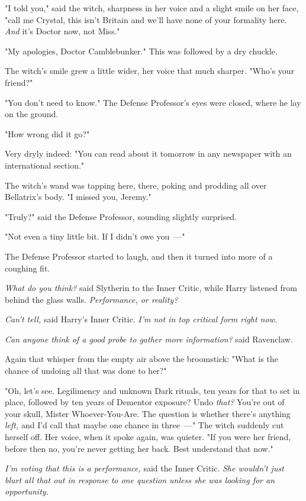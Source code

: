 "I told you," said the witch, sharpness in her voice and a slight smile on her
face, "call me Crystal, this isn't Britain and we'll have none of your
formality here. \emph{And} it's Doctor now, not Miss."

"My apologies, Doctor Camblebunker." This was followed by a dry chuckle.

The witch's smile grew a little wider, her voice that much sharper. "Who's your
friend?"

"You don't need to know." The Defense Professor's eyes were closed, where he
lay on the ground.

"How wrong did it go?"

Very dryly indeed: "You can read about it tomorrow in any newspaper with an
international section."

The witch's wand was tapping here, there, poking and prodding all over
Bellatrix's body. "I missed you, Jeremy."

"Truly?" said the Defense Professor, sounding slightly surprised.

"Not even a tiny little bit. If I didn't owe you~---"

The Defense Professor started to laugh, and then it turned into more of a
coughing fit.

\emph{What do you think?} said Slytherin to the Inner Critic, while Harry
listened from behind the glass walls. \emph{Performance, or reality?}

\emph{Can't tell,} said Harry's Inner Critic. \emph{I'm not in top critical
form right now.}

\emph{Can anyone think of a good probe to gather more information?} said
Ravenclaw.

Again that whisper from the empty air above the broomstick: "What is the chance
of undoing all that was done to her?"

"Oh, let's see. Legilimency and unknown Dark rituals, ten years for that to set
in place, followed by ten years of Dementor exposure? Undo \emph{that?} You're
out of your skull, Mister Whoever-You-Are. The question is whether there's
anything \emph{left,} and I'd call that maybe one chance in three~---" The witch
suddenly cut herself off. Her voice, when it spoke again, was quieter. "If you
were her friend, before{\el} then no, you're never getting her back. Best
understand that now."

\emph{I'm voting that this is a performance,} said the Inner Critic. \emph{She
wouldn't just blurt all that out in response to one question unless she was
looking for an opportunity.}

